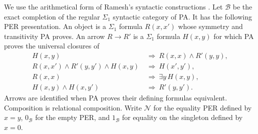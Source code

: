 \documentclass[11pt]{article}
\theoremstyle{definition}
\theoremstyle{remark}
\begin{document}
We use the arithmetical form of Ramesh's syntactic constructions
\cite[Constructions~2.9--2.10, pp.~49--53]{Ramesh}.
Let $\mathcal B$ be the exact completion of the regular
$\Sigma_1$ syntactic category of PA. It has the following PER
presentation. An object is a $\Sigma_1$ formula $R(x,x')$ whose
symmetry and transitivity PA proves. An arrow $R\to R'$ is a
$\Sigma_1$ formula $H(x,y)$ for which PA proves the universal
closures of
\begin{align*}
 H(x,y)&\ \Longrightarrow\ R(x,x)\wedge R'(y,y),\\
 R(x,x')\wedge R'(y,y')\wedge H(x,y)
   &\ \Longrightarrow\ H(x',y'),\\
 R(x,x)&\ \Longrightarrow\ \exists y\,H(x,y),\\
 H(x,y)\wedge H(x,y')&\ \Longrightarrow\ R'(y,y').
\end{align*}
Arrows are identified when PA proves their defining formulas
equivalent. Composition is relational composition. Write
$\mathcal N$ for the equality PER defined by $x=y$,
$0_{\mathcal B}$ for the empty PER, and $1_{\mathcal B}$ for
equality on the singleton defined by $x=0$.
\end{document}
